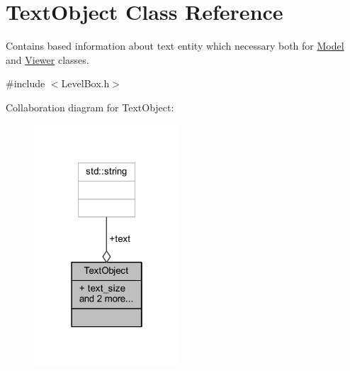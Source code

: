 \hypertarget{class_text_object}{}\section{Text\+Object Class Reference}
\label{class_text_object}


Contains based information about text entity which necessary both for \hyperlink{class_model}{Model} and \hyperlink{class_viewer}{Viewer} classes.  




{\ttfamily \#include $<$Level\+Box.\+h$>$}



Collaboration diagram for Text\+Object\+:\nopagebreak
\begin{figure}[H]
\begin{center}
\leavevmode
\includegraphics[width=154pt]{class_text_object__coll__graph}
\end{center}
\end{figure}
